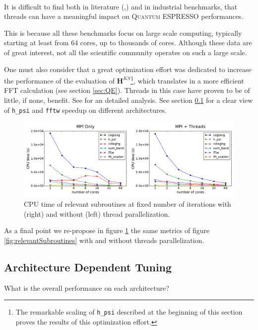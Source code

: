 \documentclass[a4paper,12pt]{article}
\newcommand\mf[1]{\mathbf{#1}}
\newcommand\QE{\textsc{Quantum} ESPRESSO }
\begin{document}
~

It is difficult to find both in literature (\cite{QE},\cite{QE2}) and in industrial benchmarks\cite{HPC}, that threads can have a meaningful impact on \QE performances.

This is because all these benchmarks focus on large scale computing, typically starting at least from 64 cores, up to thousands of cores.
Although these data are of great interest, not all the scientific community operates on such a large scale.

One must also consider that a great optimization effort was dedicated to increase the performance of the evaluation of $\mf{H}^{KS}$\footnote{The remarkable scaling of \texttt{h\_psi} described at the beginning of this section proves the results of this optimization effort.}, which translates in a more efficient FFT calculation (see section \ref{sec:QE}). 
Threads in this case have proven to be of little, if none, benefit. 
See \cite{FFTPAPER} for an detailed analysis.
See section \ref{sec:resArchDependent} for a clear view of \texttt{h\_psi} and \texttt{fftw} speedup on different architectures.

\begin{figure}[hhh!]
\centerline{ \includegraphics[width=1.2\linewidth]{threads_comparison.pdf}	}
	\caption{CPU time of relevant subroutines at fixed number of iterations with (right) and without (left) thread parallelization.}
	\label{fig:threadsComparison}
\end{figure}

As a final point we re-propose in figure \ref{fig:threadsComparison} the same metrics of figure \ref{fig:relevantSubroutines} with and without threads parallelization.

\newpage
\subsection{Architecture Dependent Tuning}\label{sec:resArchDependent}
\begin{center}
\begin{framed}
	What is the overall performance on each architecture?
\end{framed}
\end{center}
\end{document}
